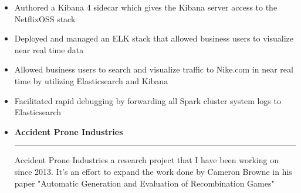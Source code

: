 \documentclass[overlapped]{res}
\begin{document}
\begin{resume}
\begin{itemize}[leftmargin=0in]
\begin{itemize}[leftmargin=0in]
\begin{samepage}
\begin{itemize}
                        \item[\textbullet] Authored a Kibana 4 sidecar which gives the Kibana server access to the NetflixOSS stack
                        \item[\textbullet] Deployed and managed an ELK stack that allowed business users to visualize near real time data
                        \item[\textbullet] Allowed business users to search and visualize traffic to Nike.com in near real time by utilizing Elasticsearch and Kibana 
                        \item[\textbullet] Facilitated rapid debugging by forwarding all Spark cluster system logs to Elasticsearch
                    \end{itemize}
                \end{samepage}
        \end{itemize}
\end{itemize}
\vspace{0.25in}

\begin{itemize}[leftmargin=0in]
    \item[] \textbf{Accident Prone Industries} \\[-0.1in] \rule{\textwidth}{0.5pt}
        Accident Prone Industries a research project that I have been working on since 2013. It's an effort to expand the work done by Cameron Browne in his paper "Automatic Generation and Evaluation
        of Recombination Games"


\end{itemize}
\end{resume}
\end{document}
